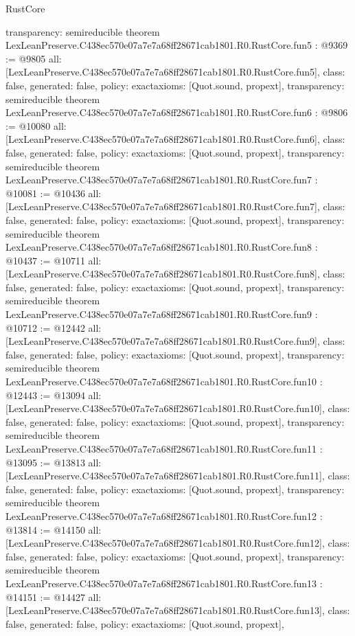 \begin{lexlean}{RustCore}
\begin{coremodule}
{  transparency: semireducible
}
theorem LexLeanPreserve.C438ec570e07a7e7a68ff28671cab1801.R0.RustCore.fun5 : @9369 := @9805 {
  all: [LexLeanPreserve.C438ec570e07a7e7a68ff28671cab1801.R0.RustCore.fun5],
  class: false,
  generated: false,
  policy: exact{axioms: [Quot.sound, propext]},
  transparency: semireducible
}
theorem LexLeanPreserve.C438ec570e07a7e7a68ff28671cab1801.R0.RustCore.fun6 : @9806 := @10080 {
  all: [LexLeanPreserve.C438ec570e07a7e7a68ff28671cab1801.R0.RustCore.fun6],
  class: false,
  generated: false,
  policy: exact{axioms: [Quot.sound, propext]},
  transparency: semireducible
}
theorem LexLeanPreserve.C438ec570e07a7e7a68ff28671cab1801.R0.RustCore.fun7 : @10081 := @10436 {
  all: [LexLeanPreserve.C438ec570e07a7e7a68ff28671cab1801.R0.RustCore.fun7],
  class: false,
  generated: false,
  policy: exact{axioms: [Quot.sound, propext]},
  transparency: semireducible
}
theorem LexLeanPreserve.C438ec570e07a7e7a68ff28671cab1801.R0.RustCore.fun8 : @10437 := @10711 {
  all: [LexLeanPreserve.C438ec570e07a7e7a68ff28671cab1801.R0.RustCore.fun8],
  class: false,
  generated: false,
  policy: exact{axioms: [Quot.sound, propext]},
  transparency: semireducible
}
theorem LexLeanPreserve.C438ec570e07a7e7a68ff28671cab1801.R0.RustCore.fun9 : @10712 := @12442 {
  all: [LexLeanPreserve.C438ec570e07a7e7a68ff28671cab1801.R0.RustCore.fun9],
  class: false,
  generated: false,
  policy: exact{axioms: [Quot.sound, propext]},
  transparency: semireducible
}
theorem LexLeanPreserve.C438ec570e07a7e7a68ff28671cab1801.R0.RustCore.fun10 : @12443 := @13094 {
  all: [LexLeanPreserve.C438ec570e07a7e7a68ff28671cab1801.R0.RustCore.fun10],
  class: false,
  generated: false,
  policy: exact{axioms: [Quot.sound, propext]},
  transparency: semireducible
}
theorem LexLeanPreserve.C438ec570e07a7e7a68ff28671cab1801.R0.RustCore.fun11 : @13095 := @13813 {
  all: [LexLeanPreserve.C438ec570e07a7e7a68ff28671cab1801.R0.RustCore.fun11],
  class: false,
  generated: false,
  policy: exact{axioms: [Quot.sound, propext]},
  transparency: semireducible
}
theorem LexLeanPreserve.C438ec570e07a7e7a68ff28671cab1801.R0.RustCore.fun12 : @13814 := @14150 {
  all: [LexLeanPreserve.C438ec570e07a7e7a68ff28671cab1801.R0.RustCore.fun12],
  class: false,
  generated: false,
  policy: exact{axioms: [Quot.sound, propext]},
  transparency: semireducible
}
theorem LexLeanPreserve.C438ec570e07a7e7a68ff28671cab1801.R0.RustCore.fun13 : @14151 := @14427 {
  all: [LexLeanPreserve.C438ec570e07a7e7a68ff28671cab1801.R0.RustCore.fun13],
  class: false,
  generated: false,
  policy: exact{axioms: [Quot.sound, propext]},
}
\end{coremodule}
\end{lexlean}
